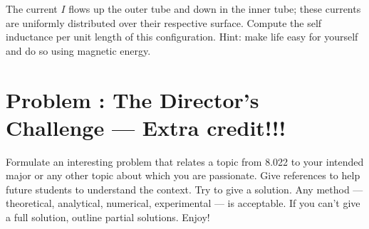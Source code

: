 \documentclass[problems]{esg8022pset}
\begin{document}
\par\noindent The current $I$ flows up the outer tube and down in the
inner tube; these currents are uniformly distributed over their
respective surface.  Compute the self inductance per unit length of
this configuration.  Hint: make life easy for yourself and do so using
magnetic energy.
\section{Problem \thesection: The Director's Challenge --- Extra credit!!!}
   Formulate an interesting problem that relates a topic from 8.022 to your
  intended major or any other topic about which you are passionate.  Give references
  to help future students to understand the context.  Try to give a solution.
  Any method --- theoretical, analytical, numerical, experimental --- is acceptable.
  If you can't give a full solution, outline partial solutions. Enjoy!
\end{document}
